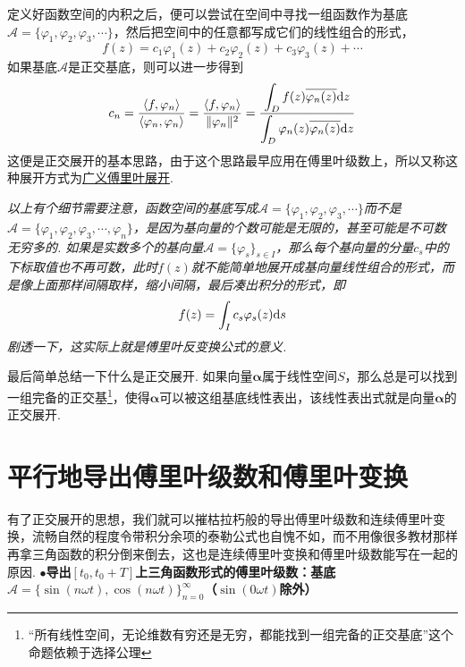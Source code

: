 定义好函数空间的内积之后，便可以尝试在空间中寻找一组函数作为基底\(\mathcal{A}=\{\varphi_1,\varphi_2,\varphi_3,\cdots\}\)，然后把空间中的任意都写成它们的线性组合的形式，
\[f(z) = c_1\varphi_1(z)+c_2\varphi_2(z)+c_3\varphi_3(z)+\cdots\]
如果基底\(\mathcal{A}\)是正交基底，则可以进一步得到
\[c_n=\frac{\langle f,\varphi_n \rangle}{\langle \varphi_n,\varphi_n \rangle} = \frac{\langle f,\varphi_n \rangle}{\|\varphi_n\|^2} = \frac{\displaystyle{\int_{D} f(z)\overline{\varphi_n(z)}{\rm d}z}}{\displaystyle{\int_{D}\varphi_n(z)\overline{\varphi_n(z)}{\rm d}z}}\]
这便是正交展开的基本思路，由于这个思路最早应用在傅里叶级数上，所以又称这种展开方式为\uline{广义傅里叶展开}.

\textit{
    以上有个细节需要注意，函数空间的基底写成\(\mathcal{A}=\{\varphi_1,\varphi_2,\varphi_3,\cdots\}\)而不是\(\mathcal{A}=\{\varphi_1,\varphi_2,\varphi_3,\cdots,\varphi_n\}\)，是因为基向量的个数可能是无限的，甚至可能是不可数无穷多的. 如果是实数多个的基向量\(\mathcal{A}=\{\varphi_s\}_{s \in I}\)，那么每个基向量的分量\(c_s\)中的下标取值也不再可数，此时\(f(z)\)就不能简单地展开成基向量线性组合的形式，而是像上面那样间隔取样，缩小间隔，最后凑出积分的形式，即
    \[f(z)=\int_{I}c_s\varphi_s(z){\rm d}s\]
    剧透一下，这实际上就是傅里叶反变换公式的意义.
}

最后简单总结一下什么是正交展开. 如果向量\(\bm{\alpha}\)属于线性空间\(S\)，那么总是可以找到一组完备的正交基\footnote{“所有线性空间，无论维数有穷还是无穷，都能找到一组完备的正交基底”这个命题依赖于选择公理}，使得\(\bm{\alpha}\)可以被这组基底线性表出，该线性表出式就是向量\(\bm{\alpha}\)的正交展开.

\section{平行地导出傅里叶级数和傅里叶变换}

有了正交展开的思想，我们就可以摧枯拉朽般的导出傅里叶级数和连续傅里叶变换，流畅自然的程度令带积分余项的泰勒公式也自愧不如，而不用像很多教材那样再拿三角函数的积分倒来倒去，这也是连续傅里叶变换和傅里叶级数能写在一起的原因.
\vspace{1cm}
\newline
\noindent \textbf{
\(\bullet\)导出\([t_0, t_0+T]\)上三角函数形式的傅里叶级数：基底\(\mathcal{A}=\{\sin(n\omega t), \cos(n\omega t)\}_{n=0}^{\infty}\)（\(\sin(0\omega t)\)除外）
}


